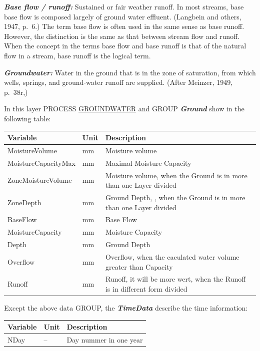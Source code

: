 \documentclass[
]{book}
\begin{document}
\textbf{\emph{Base flow / runoff:}} Sustained or fair weather runoff. In most streams, base base flow is composed largely of ground water effluent. (Langbein and others, 1947, p.~6.) The term base flow is often used in the same sense as base runoff. However, the distinction is the same as that between stream flow and runoff. When the concept in the terms base flow and base runoff is that of the natural flow in a stream, base runoff is the logical term.

\textbf{\emph{Groundwater:}} Water in the ground that is in the zone of saturation, from which wells, springs, and ground-water runoff are supplied. (After Meinzer, 1949, p.~38r,)

In this layer PROCESS \protect\hyperlink{GROUNDWATER}{GROUNDWATER} and GROUP \textbf{\emph{Ground}} show in the following table:

\begin{table}[!h]
\centering
\begin{tabular}{l|l|l}
\hline
Variable & Unit & Description\\
\hline
MoistureVolume & mm & Moisture volume\\
\cline{1-3}
MoistureCapacityMax & mm & Maximal Moisture Capacity\\
\cline{1-3}
ZoneMoistureVolume & mm & Moisture volume, when the Ground is in more than one Layer divided\\
\cline{1-3}
ZoneDepth & mm & Ground Depth, , when the Ground is in more than one Layer divided\\
\cline{1-3}
BaseFlow & mm & Base Flow\\
\cline{1-3}
MoistureCapacity & mm & Moisture Capacity\\
\cline{1-3}
Depth & mm & Ground Depth\\
\cline{1-3}
Overflow & mm & Overflow, when the caculated water volume greater than Capacity\\
\cline{1-3}
Runoff & mm & Runoff, it will be more wert, when the Runoff is in different form divided\\
\hline
\end{tabular}
\end{table}

Except the above data GROUP, the \textbf{\emph{TimeData}} describe the time information:

\begin{table}[!h]
\centering
\begin{tabular}{l|l|l}
\hline
Variable & Unit & Description\\
\hline
NDay & -- & Day nummer in one year\\
\hline
\end{tabular}
\end{table}
\end{document}
